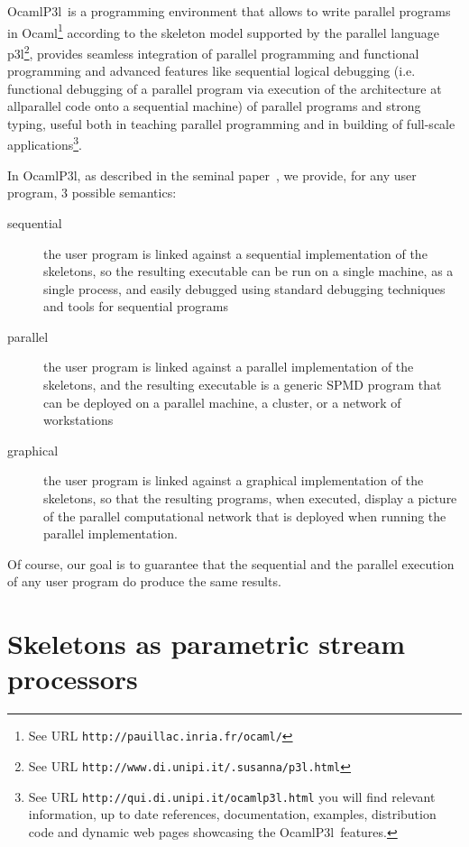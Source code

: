\documentclass{article}
\newcommand{\ocamlpiiil}{{\sf OcamlP3l}}
\newcommand{\ocaml}{{\sf Ocaml}}
\newcommand{\pppl}{{\sf p3l}}
\begin{document}
\ocamlpiiil\ is a programming environment that allows to write parallel
programs in \ocaml\footnote{See URL
  \texttt{http://pauillac.inria.fr/ocaml/}} according to the skeleton
model supported by the parallel language \pppl\footnote{See URL
  \texttt{http://www.di.unipi.it/.susanna/p3l.html}}, provides
seamless integration of parallel programming and functional
programming and advanced features like sequential logical debugging
(i.e. functional debugging of a parallel program via execution of the
architecture at allparallel code onto a
sequential machine) of parallel programs and strong typing, useful
both in teaching parallel programming and in building of
full-scale applications\footnote{See URL
  \texttt{http://qui.di.unipi.it/ocamlp3l.html} you will find relevant
  information, up to date references, documentation, examples,
  distribution code and dynamic web pages showcasing the \ocamlpiiil\
  features.}.


%
%
In \ocamlpiiil, as described in the seminal paper~\cite{Ocamlp3lMlw98},
we provide, for any user program, 3 possible semantics: 
\begin{description}
  \item[sequential] the user program is linked against a sequential implementation
                    of the skeletons, so the resulting executable can be run on
                    a single machine, as a single process, and easily debugged using
                    standard debugging techniques and tools for sequential programs
  \item[parallel]  the user program is linked against a parallel implementation
                   of the skeletons, and the resulting executable is a generic
                   SPMD program that can be deployed on a parallel machine, a cluster,
                   or a network of workstations
  \item[graphical] the user program is linked against a graphical implementation of
                   the skeletons, so that the resulting programs, when executed, 
                   display a picture of the parallel computational network that is
                   deployed when running the parallel implementation.
\end{description}
Of course, our goal is to guarantee that the sequential and the parallel execution of
any user program do produce the same results.

\section{Skeletons as parametric stream processors}
\end{document}
